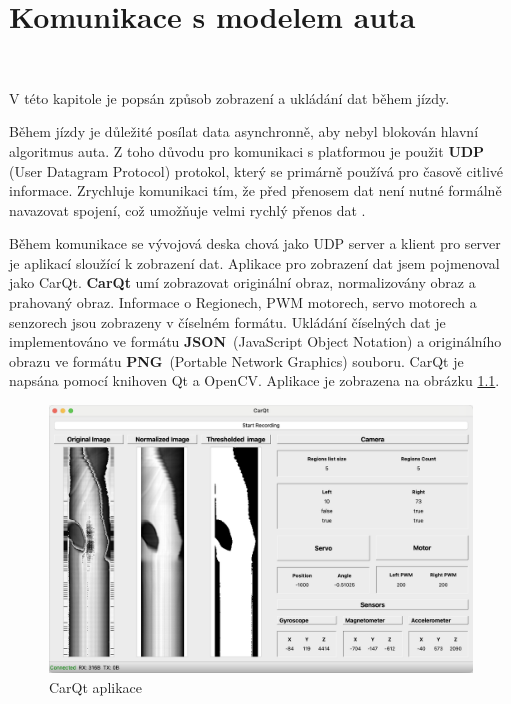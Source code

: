 \chapter{Komunikace s modelem auta}
\label{sec:PlatformCommunication}
\vspace{-20pt}
\

V této kapitole je popsán způsob zobrazení a ukládání dat během jízdy.

Během jízdy je důležité posílat data asynchronně, aby nebyl blokován hlavní
algoritmus auta. Z toho důvodu pro komunikaci s platformou je použit \textbf{UDP}
(User Datagram Protocol) protokol, který se primárně používá pro časově citlivé
informace. Zrychluje komunikaci tím, že před přenosem dat není nutné formálně
navazovat spojení, což umožňuje velmi rychlý přenos dat \cite{UDP}.

Během komunikace se vývojová deska chová jako UDP server a klient pro server je
aplikací sloužící k zobrazení dat. Aplikace pro zobrazení dat jsem pojmenoval jako
CarQt. \textbf{CarQt} umí zobrazovat originální obraz, normalizovány obraz a
prahovaný obraz. Informace o Regionech, PWM motorech, servo motorech a senzorech
jsou zobrazeny v číselném formátu. Ukládání číselných dat je implementováno ve
formátu \textbf{JSON}~(JavaScript Object Notation) a originálního obrazu ve formátu
\textbf{PNG}~(Portable Network Graphics) souboru. CarQt je napsána pomocí knihoven
Qt a OpenCV. Aplikace je zobrazena na obrázku \ref{fig:CarQt}.
\begin{figure}[!h]
    \centering
    \includegraphics[width = .7\linewidth]{Figures/CarQt.png}
    \caption{CarQt aplikace}
    \label{fig:CarQt}
\end{figure}

